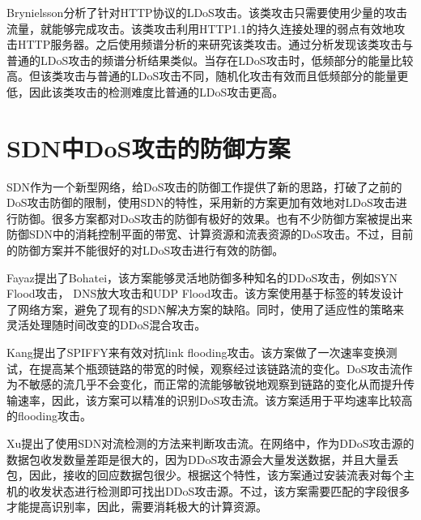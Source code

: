 Brynielsson\cite{brynielsson2015detectability}分析了针对HTTP协议的LDoS攻击。该类攻击只需要使用少量的攻击流量，就能够完成攻击。该类攻击利用HTTP1.1的持久连接处理的弱点有效地攻击HTTP服务器。之后使用频谱分析的来研究该类攻击。通过分析发现该类攻击与普通的LDoS攻击的频谱分析结果类似。当存在LDoS攻击时，低频部分的能量比较高。但该类攻击与普通的LDoS攻击不同，随机化攻击有效而且低频部分的能量更低，因此该类攻击的检测难度比普通的LDoS攻击更高。






\section{SDN中DoS攻击的防御方案}
SDN作为一个新型网络，给DoS攻击的防御工作提供了新的思路，打破了之前的DoS攻击防御的限制，使用SDN的特性，采用新的方案更加有效地对LDoS攻击进行防御。很多方案\cite{b9, b16, b10}都对DoS攻击的防御有极好的效果。也有不少防御方案\cite{b10, b12, b13, b15, b18,wang2015floodguard,zhang2017ftguard}被提出来防御SDN中的消耗控制平面的带宽、计算资源和流表资源的DoS攻击\cite{shin2013avant,cao2017disrupting}。不过，目前的防御方案并不能很好的对LDoS攻击进行有效的防御。


Fayaz\cite{b9}提出了Bohatei，该方案能够灵活地防御多种知名的DDoS攻击，例如SYN Flood攻击， DNS放大攻击和UDP Flood攻击。该方案使用基于标签的转发设计了网络方案，避免了现有的SDN解决方案的缺陷。同时，使用了适应性的策略来灵活处理随时间改变的DDoS混合攻击。

Kang\cite{b16}提出了SPIFFY来有效对抗link flooding攻击。该方案做了一次速率变换测试，在提高某个瓶颈链路的带宽的时候，观察经过该链路流的变化。DoS攻击流作为不敏感的流几乎不会变化，而正常的流能够敏锐地观察到链路的变化从而提升传输速率，因此，该方案可以精准的识别DoS攻击流。该方案适用于平均速率比较高的flooding攻击。

Xu\cite{b10}提出了使用SDN对流检测的方法来判断攻击流。在网络中，作为DDoS攻击源的数据包收发数量差距是很大的，因为DDoS攻击源会大量发送数据，并且大量丢包，因此，接收的回应数据包很少。根据这个特性，该方案通过安装流表对每个主机的收发状态进行检测即可找出DDoS攻击源。不过，该方案需要匹配的字段很多才能提高识别率，因此，需要消耗极大的计算资源。


